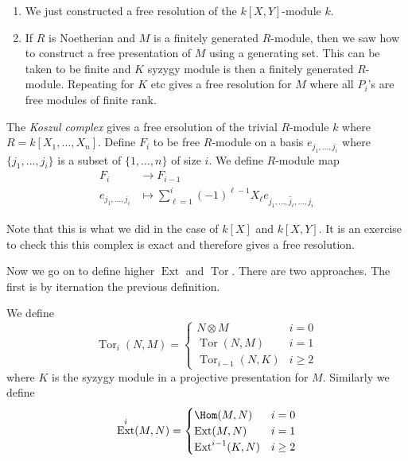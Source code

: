 \documentclass[a4paper]{article}
\DeclareMathOperator{\Tor}{Tor}
\DeclareMathOperator{\Ext}{Ext}
\begin{document}
\begin{remark}\leavevmode
  \begin{enumerate}
  \item We just constructed a free resolution of the \(k[X, Y]\)-module \(k\).
  \item If \(R\) is Noetherian and \(M\) is a finitely generated \(R\)-module, then we saw how to construct a free presentation of \(M\) using a generating set. This can be taken to be finite and \(K\) syzygy module is then a finitely generated \(R\)-module. Repeating for \(K\) etc gives a free resolution for \(M\) where all \(P_i\)'s are free modules of finite rank.
  \end{enumerate}
\end{remark}

\begin{definition}
  The \emph{Koszul complex} gives a free ersolution of the trivial \(R\)-module \(k\) where \(R = k[X_1, \dots, X_n]\). Define \(F_i\) to be free \(R\)-module on a basis \(e_{j_1, \dots, j_i}\) where \(\{j_1, \dots, j_i\}\) is a subset of \(\{1, \dots, n\}\) of size \(i\). We define \(R\)-module map
  \begin{align*}
    F_i &\to F_{i - 1} \\
    e_{j_1, \dots, j_i} &\mapsto \sum_{\ell = 1}^i (-1)^{\ell - 1} X_\ell e_{j_1, \dots, \hat j_{\ell}, \dots, j_i}
  \end{align*}
\end{definition}

Note that this is what we did in the case of \(k[X]\) and \(k[X, Y]\). It is an exercise to check this this complex is exact and therefore gives a free resolution.

Now we go on to define higher \(\Ext\) and \(\Tor\). There are two approaches. The first is by iternation the previous definition.

\begin{definition}
  We define
  \[
    \Tor_i(N, M) =
    \begin{cases}
      N \otimes M & i = 0 \\
      \Tor(N, M) & i = 1 \\
      \Tor_{i - 1}(N, K) & i \geq 2
    \end{cases}
  \]
  where \(K\) is the syzygy module in a projective presentation for \(M\). Similarly we define
  \[
    \Ext^i(M, N) =
    \begin{cases}
      \Hom(M, N) & i = 0 \\
      \Ext(M, N) & i = 1 \\
      \Ext^{i - 1}(K, N) & i \geq 2
    \end{cases}
  \]
\end{definition}
\end{document}
